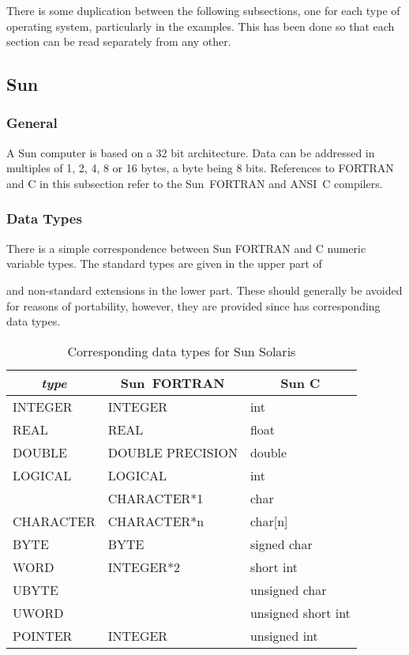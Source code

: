 \documentclass[twoside,11pt,nolof]{starlink}
\newcounter{examples}
\begin{document}
There is some duplication between the following subsections, one for each type
of operating system, particularly in the examples. This has been done so that
each section can be read separately from any other.

\subsection{Sun}

\subsubsection{General}

A Sun computer is based on a 32 bit architecture. Data can be addressed in
multiples of 1, 2, 4, 8 or 16 bytes, a byte being 8 bits. References to FORTRAN
and C in this subsection refer to the Sun~FORTRAN and ANSI~C compilers.

\subsubsection{Data Types}

There is a simple correspondence between Sun FORTRAN and C numeric variable
types.
The standard types are given in the upper part of


 and
non-standard extensions in the lower part. These should generally be avoided
for reasons of portability, however, they are provided since
 
has corresponding data types.

\begin{table}[htb]
\begin{center}
\begin{tabular}{|l|l|l|} \hline
\multicolumn{1}{|c|}{\textit{type}} & \multicolumn{1}{|c|}{Sun~FORTRAN} &
\multicolumn{1}{c|}{Sun C} \\ \hline
INTEGER & INTEGER & int \\
REAL & REAL & float \\
DOUBLE & DOUBLE PRECISION & double \\
LOGICAL & LOGICAL & int \\
 & CHARACTER*1 & char \\
CHARACTER & CHARACTER*n & char[n] \\ \hline
BYTE & BYTE & signed char \\
WORD & INTEGER*2 & short int\\
UBYTE && unsigned char \\
UWORD && unsigned short int\\ \hline
POINTER & INTEGER & unsigned int\\ \hline
\end{tabular}
\end{center}
\caption{Corresponding data types for Sun Solaris}
\label{sun_datatypes}
\end{table}
\end{document}
